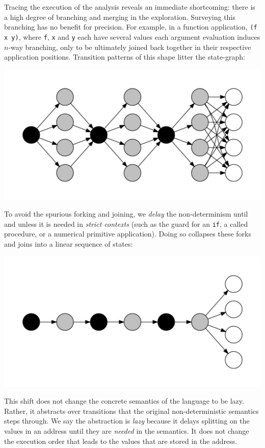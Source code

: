 \documentclass[preprint,onecolumn,9pt]{sigplanconf} %
\begin{document}
Tracing the execution of the analysis reveals an immediate shortcoming:
there is a high degree of branching and merging in the exploration.
%
Surveying this branching has no benefit for precision.
%
For example, in a function application, {\tt (f x y)},
where {\tt f}, {\tt x} and {\tt y} each have several values
each argument evaluation induces $n$-way branching, only to be ultimately joined back together in their respective
application positions.
%
Transition patterns of this shape litter the state-graph:
%
\begin{center}
\includegraphics[scale=0.2]{fanoutdot2}
\end{center}
To avoid the spurious forking and joining, we {\it delay} the non-determinism
until and unless it is needed in {\it strict contexts} (such as the guard for an
{\tt if}, a called procedure, or a numerical primitive application).
%
Doing so collapses these forks and joins into a linear sequence of states:
\begin{center}
\includegraphics[scale=0.2]{lazydot}
\end{center}

This shift does not change the concrete semantics of the language to
be lazy.  Rather, it abstracts over transitions that the original
non-deterministic semantics steps through.
%
We say the abstraction is \emph{lazy} because it delays splitting on
the values in an address until they are \emph{needed} in the
semantics. It does not change the execution order that leads to the
values that are stored in the address.
\end{document}
